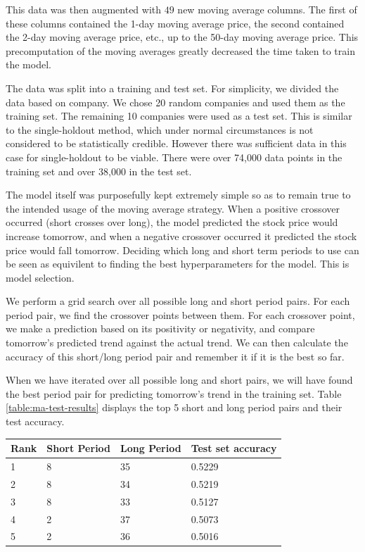 \documentclass{report}
\begin{document}
This data was then augmented with $49$ new moving average columns. The first of these columns contained the 1-day moving average price, the second contained the 2-day moving average price, etc., up to the 50-day moving average price. This precomputation of the moving averages greatly decreased the time taken to train the model.

The data was split into a training and test set. For simplicity, we divided the data based on company. We chose 20 random companies and used them as the training set. The remaining 10 companies were used as a test set. This is similar to the single-holdout method, which under normal circumstances is not considered to be statistically credible. However there was sufficient data in this case for single-holdout to be viable. There were over 74,000 data points in the training set and over 38,000 in the test set.

The model itself was purposefully kept extremely simple so as to remain true to the intended usage of the moving average strategy. When a positive crossover occurred (short crosses over long), the model predicted the stock price would increase tomorrow, and when a negative crossover occurred it predicted the stock price would fall tomorrow. Deciding which long and short term periods to use can be seen as equivilent to finding the best hyperparameters for the model. This is model selection.

We perform a grid search over all possible long and short period pairs. For each period pair, we find the crossover points between them. For each crossover point, we make a prediction based on its positivity or negativity, and compare tomorrow's predicted trend against the actual trend. We can then calculate the accuracy of this short/long period pair and remember it if it is the best so far.

When we have iterated over all possible long and short pairs, we will have found the best period pair for predicting tomorrow's trend in the training set. Table \ref{table:ma-test-results} displays the top 5 short and long period pairs and their test accuracy.


\begin{center}
    \begin{tabular}{l | l | l | l}
    Rank & Short Period & Long Period & Test set accuracy \\ \hline
    1 & 8 & 35 & 0.5229 \\ \hline
    2 & 8 & 34 & 0.5219 \\ \hline
    3 & 8 & 33 & 0.5127 \\ \hline
    4 & 2 & 37 & 0.5073 \\ \hline
    5 & 2 & 36 & 0.5016 
    \label{table:ma-test-results}
    \end{tabular}
\end{center}
\end{document}
